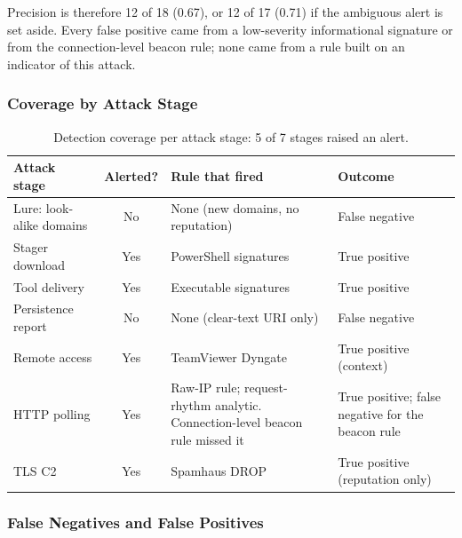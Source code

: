 Precision is therefore 12 of 18 (0.67), or 12 of 17 (0.71) if the ambiguous alert is set aside. Every false positive came from a low-severity informational signature or from the connection-level beacon rule; none came from a rule built on an indicator of this attack.

\subsubsection{Coverage by Attack Stage}

\begin{table}[htbp]
  \centering
  \caption{Detection coverage per attack stage: 5 of 7 stages raised an alert.}
  \label{tab:coverage-stages}
  \scriptsize
  \setlength{\tabcolsep}{3pt}
  \begin{tabularx}{\linewidth}{@{}YcYY@{}}
    \toprule
    \textbf{Attack stage} & \textbf{Alerted?} & \textbf{Rule that fired} & \textbf{Outcome} \\
    \midrule
    Lure: look-alike domains & No & None (new domains, no reputation) & False negative \\
    Stager download & Yes & PowerShell signatures & True positive \\
    Tool delivery & Yes & Executable signatures & True positive \\
    Persistence report & No & None (clear-text URI only) & False negative \\
    Remote access & Yes & TeamViewer Dyngate & True positive (context) \\
    HTTP polling & Yes & Raw-IP rule; request-rhythm analytic. Connection-level beacon rule missed it & True positive; false negative for the beacon rule \\
    TLS C2 & Yes & Spamhaus DROP & True positive (reputation only) \\
    \bottomrule
  \end{tabularx}
\end{table}

\subsubsection{False Negatives and False Positives}

